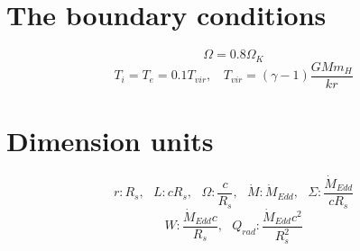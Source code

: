 \documentclass[12pt]{book}
\begin{document}
\section{The boundary conditions}
\begin{equation}
\Omega=0.8\Omega_{K}
\end{equation}
\begin{equation}
 T_i=T_e=0.1T_{vir},~~~~T_{vir}=(\gamma-1)\frac{GMm_{H}}{kr}
\end{equation}
%
\section{Dimension units}
\begin{equation}
r: R_s,~~~L:cR_s,~~~\Omega:\frac{c}{R_s},~~~\dot M: \dot M_{Edd},~~~\Sigma:\frac{\dot M_{Edd}}{cR_s}
\end{equation}
\begin{equation}
W:\frac{\dot M_{Edd}c}{R_s},~~~Q_{rad}:\frac{\dot M_{Edd}c^2}{R_s^2}
\end{equation}
%
\end{document}
